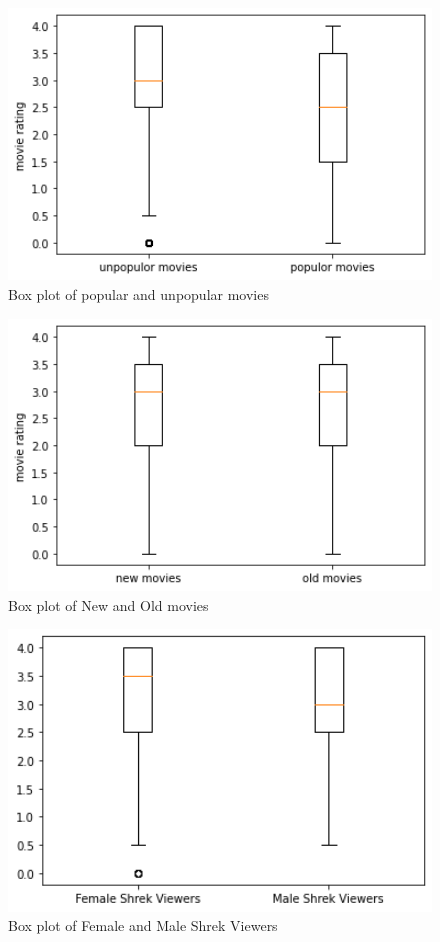 \documentclass{article}
\begin{document}
\begin{figure}
\label{fig:foo}
\includegraphics[width=15cm]{data analysis project 1/boxplot question 1..png}
\caption{Box plot of popular and unpopular movies}
\end{figure}
\begin{figure}
\label{fig:foo}
\includegraphics[width=15cm]{data analysis project 1/boxplot question 2.png}
\caption{Box plot of New and Old movies}
\end{figure}


\begin{figure}
\label{fig:foo}
\includegraphics[width=15cm]{data analysis project 1/boxplot question 3.png}
\caption{Box plot of Female and Male Shrek Viewers}
\end{figure}
\end{document}
